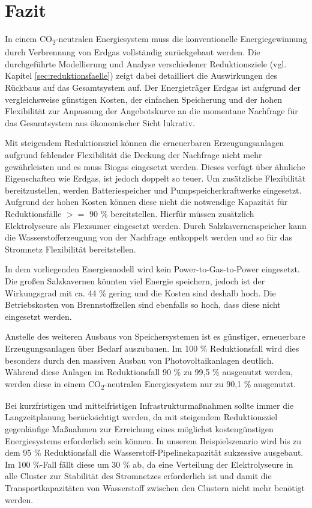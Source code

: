 \section{Fazit}
In einem CO\textsubscript{2}-neutralen Energiesystem muss die konventionelle Energiegewinnung durch Verbrennung von Erdgas vollständig zurückgebaut werden. Die durchgeführte Modellierung und Analyse verschiedener Reduktionsziele (vgl. Kapitel \ref{sec:reduktionsfaelle}) zeigt dabei detailliert die Auswirkungen des Rückbaus auf das Gesamtsystem auf.
Der Energieträger Erdgas ist aufgrund der vergleichsweise günstigen Kosten, der einfachen Speicherung und der hohen Flexibilität zur Anpassung der Angebotskurve an die momentane Nachfrage für das Gesamtsystem aus ökonomischer Sicht lukrativ. 

Mit steigendem Reduktionsziel können die erneuerbaren Erzeugungsanlagen aufgrund fehlender Flexibilität die Deckung der Nachfrage nicht mehr gewährleisten und es muss Biogas eingesetzt werden. Dieses verfügt über ähnliche Eigenschaften wie Erdgas, ist jedoch doppelt so teuer. Um zusätzliche Flexibilität bereitzustellen, werden Batteriespeicher und Pumpspeicherkraftwerke eingesetzt. Aufgrund der hohen Kosten können diese nicht die notwendige Kapazität für Reduktionsfälle $>=$ 90 \% bereitstellen.
Hierfür müssen zusätzlich Elektrolyseure als Flexsumer eingesetzt werden. Durch Salzkavernenspeicher kann die Wasserstofferzeugung von der Nachfrage entkoppelt werden und so für das Stromnetz Flex\-ibilität bereitstellen.  

In dem vorliegenden Energiemodell wird kein Power-to-Gas-to-Power eingesetzt. Die großen Salzkavernen könnten viel Energie speichern, jedoch ist der Wirkungsgrad mit ca. 44 \% gering und die Kosten sind deshalb hoch. Die Betriebskosten von Brennstoffzellen sind ebenfalls so hoch, dass diese nicht eingesetzt werden. 

Anstelle des weiteren Ausbaus von Speichersystemen ist es günstiger, erneuerbare Erzeugungsanlagen über Bedarf auszubauen. Im 100 \% Reduktionsfall wird dies besonders durch den massiven Ausbau von Photovoltaikanlagen deutlich. Während diese Anlagen im Reduktionsfall 90 \% zu 99,5 \% ausgenutzt werden, werden diese in einem CO\textsubscript{2}-neutralen Energiesystem nur zu 90,1 \% ausgenutzt.  

Bei kurzfristigen und mittelfristigen Infrastrukturmaßnahmen sollte immer die Langzeitplanung berücksichtigt werden, da mit steigendem Reduktionsziel gegenläufige Maßnahmen zur Erreichung eines möglichst kostengünstigen Energiesystems erforderlich sein können. In unserem Beispielszenario wird bis zu dem 95 \% Reduktionsfall die Wasserstoff-Pipeline\-kapazität sukzessive ausgebaut. Im 100 \%-Fall fällt diese um 30 \% ab, da eine Verteilung der Elektrolyseure in alle Cluster zur Stabilität des Stromnetzes erforderlich ist und damit die Transportkapazitäten von Wasserstoff zwischen den Clustern nicht mehr benötigt werden.

